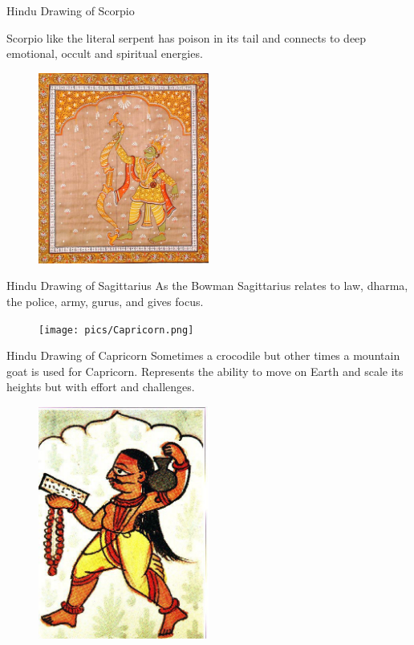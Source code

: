  

Hindu Drawing of Scorpio

Scorpio like the literal serpent has poison in its tail and connects to deep emotional, occult and spiritual energies.


\begin{figure}[H]
 \centering
\includegraphics[width=0.5\textwidth]{pics/Sagitarius.png}
 \end{figure}


Hindu Drawing of Sagittarius
As the Bowman
Sagittarius relates to law, dharma, the police, army, gurus, and gives focus.

 

\begin{figure}[H]
 \centering
\texttt{[image: pics/Capricorn.png]}
 \end{figure}

 

Hindu Drawing of Capricorn
Sometimes a crocodile but other times a mountain goat is used for Capricorn.
Represents the ability to move on Earth and scale its heights but with effort and challenges.

 

\begin{figure}[H]
 \centering
\includegraphics[width=0.5\textwidth]{pics/Aquarius.png}
 \end{figure}

